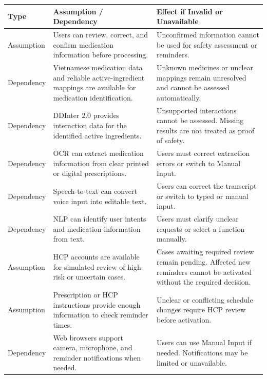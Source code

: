\begin{longtable}{|L{0.16\textwidth}|L{0.43\textwidth}|L{0.31\textwidth}|}
\hline
\textbf{Type} &
\textbf{Assumption / Dependency} &
\textbf{Effect if Invalid or Unavailable}\\ \hline

Assumption
& Users can review, correct, and confirm
medication information before processing.
& Unconfirmed information cannot be used
for safety assessment or reminders.
\\ \hline

Dependency
& Vietnamese medication data and reliable
active-ingredient mappings are available
for medication identification.
& Unknown medicines or unclear mappings
remain unresolved and cannot be
assessed automatically.
\\ \hline

Dependency
& DDInter 2.0 provides interaction data
for the identified active ingredients.
& Unsupported interactions cannot be
assessed. Missing results are not
treated as proof of safety.
\\ \hline

Dependency
& OCR can extract medication information
from clear printed or digital prescriptions.
& Users must correct extraction errors
or switch to Manual Input.
\\ \hline

Dependency
& Speech-to-text can convert voice input
into editable text.
& Users can correct the transcript
or switch to typed or manual input.
\\ \hline

Dependency
& NLP can identify user intents and
medication information from text.
& Users must clarify unclear requests
or select a function manually.
\\ \hline

Assumption
& HCP accounts are available for simulated
review of high-risk or uncertain cases.
& Cases awaiting required review remain
pending. Affected new reminders cannot
be activated without the required decision.
\\ \hline

Assumption
& Prescription or HCP instructions provide
enough information to check reminder times.
& Unclear or conflicting schedule changes
require HCP review before activation.
\\ \hline

Dependency
& Web browsers support camera, microphone,
and reminder notifications when needed.
& Users can use Manual Input if needed.
Notifications may be limited or unavailable.
\\ \hline

\end{longtable}